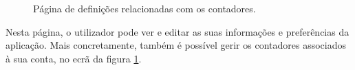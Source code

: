 \begin{figure}
\begin{minipage}{.5\textwidth}
\caption{Página de definições relacionadas com os contadores.}
\label{fig:5}
\end{minipage}
\end{figure}

Nesta página, o utilizador pode ver e editar as suas informações e preferências da aplicação. Mais concretamente, também é possível gerir os contadores associados à sua conta, no ecrã da figura \ref{fig:5}.


